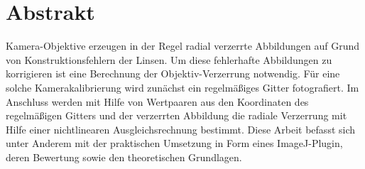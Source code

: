 \section{Abstrakt}
\label{sec:Abstrakt}
Kamera-Objektive erzeugen in der Regel radial verzerrte Abbildungen auf Grund von Konstruktionsfehlern der Linsen. 
Um diese fehlerhafte Abbildungen zu korrigieren ist eine Berechnung der Objektiv-Verzerrung notwendig. 
Für eine solche Kamerakalibrierung wird zunächst ein regelmäßiges Gitter fotografiert. 
Im Anschluss werden mit Hilfe von Wertpaaren aus den Koordinaten des regelmäßigen Gitters und der verzerrten Abbildung die radiale Verzerrung mit Hilfe einer nichtlinearen Ausgleichsrechnung bestimmt. 
Diese Arbeit befasst sich unter Anderem mit der praktischen Umsetzung in Form eines ImageJ-Plugin, deren Bewertung sowie den theoretischen Grundlagen.  





